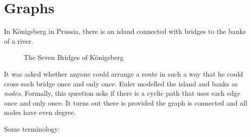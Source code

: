 \section{Graphs}

In Königsberg in Prussia, there is an island connected
with bridges to the banks of a river.

\begin{figure}
    \caption{The Seven Bridges of Königsberg}
\end{figure}

It was asked whether anyone could arrange a route in
such a way that he could cross each bridge once and
only once. Euler modelled the island and banks as
\emph{nodes}. Formally, this question asks if there is a cyclic
path that uses each edge once and only once. It turns out
there is provided the graph is connected and all nodes have
even degree.

Some terminology:

